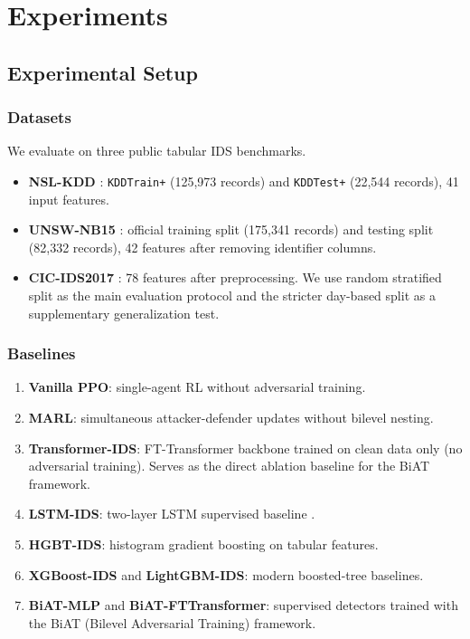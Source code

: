 \section{Experiments}
\label{sec:experiments}

\subsection{Experimental Setup}
\label{sec:setup}

\subsubsection{Datasets}

We evaluate on three public tabular IDS benchmarks.
\begin{itemize}
    \item \textbf{NSL-KDD} \cite{tavallaee2009nslkdd}: \texttt{KDDTrain+} (125,973 records) and \texttt{KDDTest+} (22,544 records), 41 input features.
    \item \textbf{UNSW-NB15} \cite{moustafa2015unswnb15}: official training split (175,341 records) and testing split (82,332 records), 42 features after removing identifier columns.
    \item \textbf{CIC-IDS2017} \cite{sharafaldin2018cicids2017}: 78 features after preprocessing. We use random stratified split as the main evaluation protocol and the stricter day-based split as a supplementary generalization test.
\end{itemize}

\subsubsection{Baselines}

\begin{enumerate}
    \item \textbf{Vanilla PPO}: single-agent RL without adversarial training.
    \item \textbf{MARL}: simultaneous attacker-defender updates without bilevel nesting.
    \item \textbf{Transformer-IDS}: FT-Transformer backbone \cite{gorishniy2021fttransformer} trained on clean data only (no adversarial training). Serves as the direct ablation baseline for the BiAT framework.
    \item \textbf{LSTM-IDS}: two-layer LSTM supervised baseline \cite{staudemeyer2019lstm}.
    \item \textbf{HGBT-IDS}: histogram gradient boosting on tabular features.
    \item \textbf{XGBoost-IDS} and \textbf{LightGBM-IDS}: modern boosted-tree baselines.
    \item \textbf{BiAT-MLP} and \textbf{BiAT-FTTransformer}: supervised detectors trained with the BiAT (Bilevel Adversarial Training) framework.
\end{enumerate}

